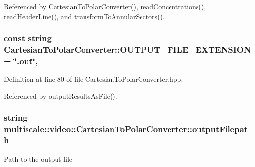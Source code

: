 Referenced by Cartesian\-To\-Polar\-Converter(), read\-Concentrations(), read\-Header\-Line(), and transform\-To\-Annular\-Sectors().

\hypertarget{classmultiscale_1_1video_1_1CartesianToPolarConverter_a3dcad19e1da427627d783a3053174372}{
\subsubsection[{O\-U\-T\-P\-U\-T\-\_\-\-F\-I\-L\-E\-\_\-\-E\-X\-T\-E\-N\-S\-I\-O\-N}]{\setlength{\rightskip}{0pt plus 5cm}const string Cartesian\-To\-Polar\-Converter\-::\-O\-U\-T\-P\-U\-T\-\_\-\-F\-I\-L\-E\-\_\-\-E\-X\-T\-E\-N\-S\-I\-O\-N = \char`\"{}.out\char`\"{}\hspace{0.3cm}{\ttfamily [static]}, {\ttfamily [private]}}}\label{classmultiscale_1_1video_1_1CartesianToPolarConverter_a3dcad19e1da427627d783a3053174372}


Definition at line 80 of file Cartesian\-To\-Polar\-Converter.\-hpp.



Referenced by output\-Results\-As\-File().

\hypertarget{classmultiscale_1_1video_1_1CartesianToPolarConverter_a024d95ab3b9de6ed6fd1d951c5575e65}{
\subsubsection[{output\-Filepath}]{\setlength{\rightskip}{0pt plus 5cm}string multiscale\-::video\-::\-Cartesian\-To\-Polar\-Converter\-::output\-Filepath\hspace{0.3cm}{\ttfamily [private]}}}\label{classmultiscale_1_1video_1_1CartesianToPolarConverter_a024d95ab3b9de6ed6fd1d951c5575e65}
Path to the output file 

